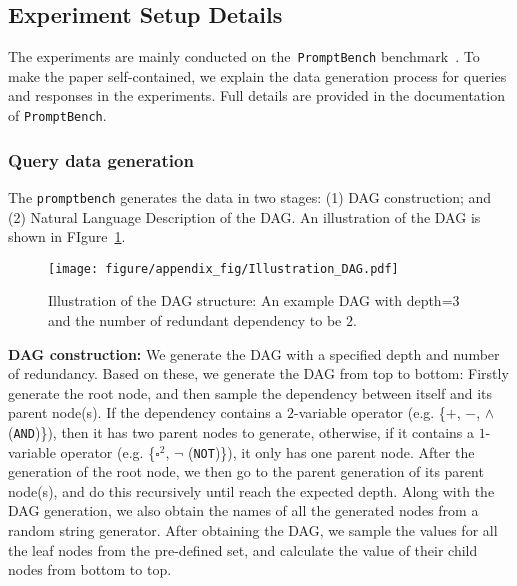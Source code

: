 \subsection{Experiment Setup Details}
\label{subsection: appendix-experiment-setup}
The experiments are mainly conducted on the~\texttt{PromptBench} benchmark~\citep{zhu2023dyval}. To make the paper self-contained, we explain the data generation process for queries and responses in the experiments. Full details are provided in the documentation of \texttt{PromptBench}.


\subsubsection{Query data generation}
The \texttt{promptbench} generates the data in two stages: (1) DAG construction; and (2) Natural Language Description of the DAG. An illustration of the DAG is shown in FIgure~\ref{fig: DAG illustration}.

\begin{figure}[h]
    \centering
    \texttt{[image: figure/appendix\_fig/Illustration\_DAG.pdf]}
    \caption{Illustration of the DAG structure: An example DAG with depth=$3$ and the number of redundant dependency to be $2$.}
    \label{fig: DAG illustration}
\end{figure}

\textbf{DAG construction:} We generate the DAG with a specified depth and number of redundancy. Based on these, we generate the DAG from top to bottom: Firstly generate the root node, and then sample the dependency between itself and its parent node(s). If the dependency contains a $2$-variable operator (e.g. \{$+$, $-$, $\land$ (\texttt{AND})\}), then it has two parent nodes to generate, otherwise, if it contains a $1$-variable operator (e.g. \{$\square^2$, $\neg$ (\texttt{NOT})\}), it only has one parent node. After the generation of the root node, we then go to the parent generation of its parent node(s), and do this recursively until reach the expected depth. Along with the DAG generation, we also obtain the names of all the generated nodes from a random string generator.
After obtaining the DAG, we sample the values for all the leaf nodes from the pre-defined set, and calculate the value of their child nodes from bottom to top.


